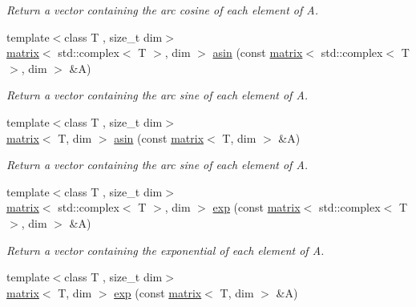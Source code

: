 \begin{DoxyCompactItemize}
\begin{DoxyCompactList}\small\item\em Return a vector containing the arc cosine of each element of A. \end{DoxyCompactList}\item 
\hypertarget{namespacekeycpp_a024251803fe616d13f26978e2ebb10cf}{{\footnotesize template$<$class T , size\-\_\-t dim$>$ }\\\hyperlink{classkeycpp_1_1matrix}{matrix}$<$ std\-::complex$<$ T $>$, dim $>$ \hyperlink{namespacekeycpp_a024251803fe616d13f26978e2ebb10cf}{asin} (const \hyperlink{classkeycpp_1_1matrix}{matrix}$<$ std\-::complex$<$ T $>$, dim $>$ \&A)}\label{namespacekeycpp_a024251803fe616d13f26978e2ebb10cf}

\begin{DoxyCompactList}\small\item\em Return a vector containing the arc sine of each element of A. \end{DoxyCompactList}\item 
\hypertarget{namespacekeycpp_af7cedb7bbe6ba4a4c6f87cff65c91298}{{\footnotesize template$<$class T , size\-\_\-t dim$>$ }\\\hyperlink{classkeycpp_1_1matrix}{matrix}$<$ T, dim $>$ \hyperlink{namespacekeycpp_af7cedb7bbe6ba4a4c6f87cff65c91298}{asin} (const \hyperlink{classkeycpp_1_1matrix}{matrix}$<$ T, dim $>$ \&A)}\label{namespacekeycpp_af7cedb7bbe6ba4a4c6f87cff65c91298}

\begin{DoxyCompactList}\small\item\em Return a vector containing the arc sine of each element of A. \end{DoxyCompactList}\item 
\hypertarget{namespacekeycpp_a0302faeef7172f537f3473216c0cf33b}{{\footnotesize template$<$class T , size\-\_\-t dim$>$ }\\\hyperlink{classkeycpp_1_1matrix}{matrix}$<$ std\-::complex$<$ T $>$, dim $>$ \hyperlink{namespacekeycpp_a0302faeef7172f537f3473216c0cf33b}{exp} (const \hyperlink{classkeycpp_1_1matrix}{matrix}$<$ std\-::complex$<$ T $>$, dim $>$ \&A)}\label{namespacekeycpp_a0302faeef7172f537f3473216c0cf33b}

\begin{DoxyCompactList}\small\item\em Return a vector containing the exponential of each element of A. \end{DoxyCompactList}\item 
\hypertarget{namespacekeycpp_a89087f62a5d5d136ad88493b920953ac}{{\footnotesize template$<$class T , size\-\_\-t dim$>$ }\\\hyperlink{classkeycpp_1_1matrix}{matrix}$<$ T, dim $>$ \hyperlink{namespacekeycpp_a89087f62a5d5d136ad88493b920953ac}{exp} (const \hyperlink{classkeycpp_1_1matrix}{matrix}$<$ T, dim $>$ \&A)}\label{namespacekeycpp_a89087f62a5d5d136ad88493b920953ac}


\end{DoxyCompactItemize}
